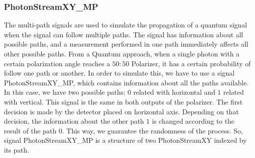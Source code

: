 \subsubsection{PhotonStreamXY\_MP}
The multi-path signals are used to simulate the propagation of a quantum signal when the signal can follow multiple paths. The signal has information about all possible paths, and a measurement performed in one path immediately affects all other possible paths.
From a Quantum approach, when a single photon with a certain polarization angle reaches a $50:50$ Polarizer, it has a certain probability of follow one path or another. In order to simulate this, we have to use a signal PhotonStreamXY\_MP, which contains information about all the paths available. In this case, we have two possible paths: $0$ related with horizontal and $1$ related with vertical. This signal is the same in both outputs of the polarizer. The first decision is made by the detector placed on horizontal axis. Depending on that decision, the information about the other path $1$ is changed according to the result of the path $0$. This way, we guarantee the randomness of the process. So, signal PhotonStreamXY\_MP is a structure of two PhotonStreamXY indexed by its path.





